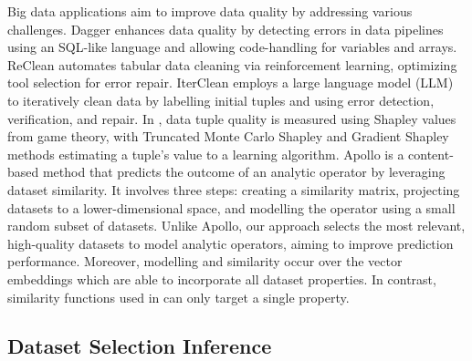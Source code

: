 Big data applications aim to improve data quality by addressing various challenges. Dagger \cite{b4DaggerRW} enhances data quality by detecting errors in data pipelines using an SQL-like language and allowing code-handling for variables and arrays. ReClean \cite{b4ReClean} automates tabular data cleaning via reinforcement learning, optimizing tool selection for error repair. IterClean \cite{b5IterCleanRW} employs a large language model (LLM) to iteratively clean data by labelling initial tuples and using error detection, verification, and repair. In \cite{b6DataShapley}, data tuple quality is measured using Shapley values from game theory, with Truncated Monte Carlo Shapley and Gradient Shapley methods estimating a tuple's value to a learning algorithm.
Apollo \cite{b7Apollo1, b7Apollo2} is a content-based method that predicts the outcome of an analytic operator by leveraging dataset similarity. It involves three steps: creating a similarity matrix, projecting datasets to a lower-dimensional space, and modelling the operator using a small random subset of datasets. Unlike Apollo, our approach selects the most relevant, high-quality datasets to model analytic operators, aiming to improve prediction performance. Moreover, modelling and similarity occur over the vector embeddings which are able to incorporate all dataset properties. In contrast, similarity functions used in \cite{b7Apollo1} can only target a single property.


\subsection{Dataset Selection Inference}

